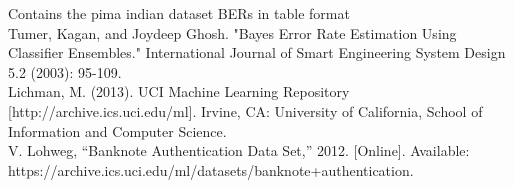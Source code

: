 \documentclass{article}
\begin{document}
		Contains the pima indian dataset BERs in table format
		\\ [0.5ex]
		\noindent[5] Tumer, Kagan, and Joydeep Ghosh. "Bayes Error Rate Estimation Using Classifier Ensembles." International Journal of Smart Engineering System Design 5.2 (2003): 95-109.
		\\ [0.5ex]
		
		\noindent[6] Lichman, M. (2013). UCI Machine Learning Repository [http://archive.ics.uci.edu/ml]. Irvine, CA: University of California, School of Information and Computer Science.
		\\ [0.5ex]
		
		\noindent [7] V. Lohweg, “Banknote Authentication Data Set,” 2012. [Online]. Available: https://archive.ics.uci.edu/ml/datasets/banknote+authentication.
	
\end{document}
